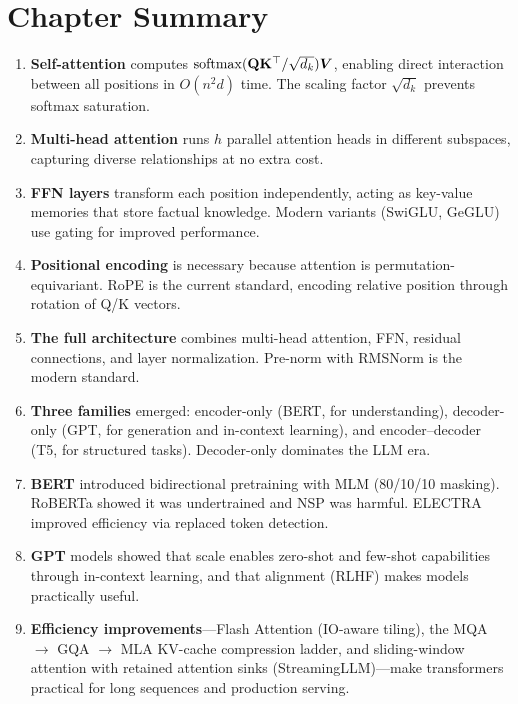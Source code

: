 \section*{Chapter Summary}

\begin{enumerate}
    \item \textbf{Self-attention} computes $\operatorname{softmax}(\mathbf{Q}\mathbf{K}^\top/\sqrt{d_k})\bm{V}$,
          enabling direct interaction between all positions in $O(n^2 d)$ time.
          The scaling factor $\sqrt{d_k}$ prevents softmax saturation.

    \item \textbf{Multi-head attention} runs $h$ parallel attention heads in
          different subspaces, capturing diverse relationships at no extra cost.

    \item \textbf{FFN layers} transform each position independently, acting as
          key-value memories that store factual knowledge.  Modern variants
          (SwiGLU, GeGLU) use gating for improved performance.

    \item \textbf{Positional encoding} is necessary because attention is
          permutation-equivariant.  RoPE is the current standard, encoding
          relative position through rotation of Q/K vectors.

    \item \textbf{The full architecture} combines multi-head attention, FFN,
          residual connections, and layer normalization.  Pre-norm with RMSNorm
          is the modern standard.

    \item \textbf{Three families} emerged: encoder-only (BERT, for understanding),
          decoder-only (GPT, for generation and in-context learning), and
          encoder--decoder (T5, for structured tasks).  Decoder-only dominates
          the LLM era.

    \item \textbf{BERT} introduced bidirectional pretraining with MLM (80/10/10
          masking).  RoBERTa showed it was undertrained and NSP was harmful.
          ELECTRA improved efficiency via replaced token detection.

    \item \textbf{GPT} models showed that scale enables zero-shot and few-shot
          capabilities through in-context learning, and that alignment (RLHF)
          makes models practically useful.

    \item \textbf{Efficiency improvements}---Flash Attention (IO-aware tiling),
          the MQA $\to$ GQA $\to$ MLA KV-cache compression ladder, and
          sliding-window attention with retained attention sinks
          (StreamingLLM)---make transformers practical for long sequences
          and production serving.
\end{enumerate}
